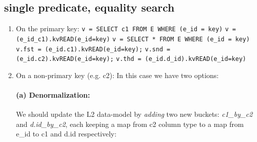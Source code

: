 \documentclass[12pt]{article}
\begin{document}
\subsection{single predicate, equality search}
\begin{enumerate}
\item {On the primary key:}
	 \hspace{5mm}\lstinline[basicstyle=\ttfamily ] 
		{v = SELECT c1 FROM E WHERE (e_id = key)}
	 \hspace{7.9mm}\lstinline[basicstyle=\ttfamily ]                        
                {v = (e_id_c1).kvREAD(e_id=key)}
	\subitem
	 \hspace{5mm}\lstinline[basicstyle=\ttfamily ] 
		{v = SELECT * FROM E WHERE (e_id = key)}
	 \hspace{7.9mm}\lstinline[basicstyle=\ttfamily ]                        
                {v.fst = (e_id.c1).kvREAD(e_id=key);}
	\subitem \hspace{18.6mm}\lstinline[basicstyle=\ttfamily ]                        
                {v.snd = (e_id.c2).kvREAD(e_id=key);}
	\subitem \hspace{18.6mm}\lstinline[basicstyle=\ttfamily ]                        
                {v.thd = (e_id.d_id).kvREAD(e_id=key)}
\item {On a non-primary key (e.g. c2):}
In this case we have two options:
\paragraph{(a) Denormalization:}
We should update the L2 data-model by \emph{adding} two new
buckets: \emph{c1\_by\_c2} and \emph{d.id\_by\_c2}, each keeping
a map from c2 column type to a map from e\_id to c1 and d.id
respectively:



\end{enumerate}
\end{document}
